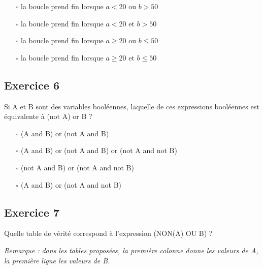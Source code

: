 \documentclass[11pt,a4paper]{article}
\renewcommand{\emph}{\textit}
\providecommand{\tightlist}{\setlength{\itemsep}{0pt}\setlength{\parskip}{0pt}}
\begin{document}
\begin{itemize}
\tightlist
\item[$\square$]
  la boucle prend fin lorsque \(a < 20\) ou \(b > 50\)
\item[$\square$]
  la boucle prend fin lorsque \(a < 20\) et \(b > 50\)
\item[$\square$]
  la boucle prend fin lorsque \(a \geqslant 20\) ou \(b \leqslant 50\)
\item[$\square$]
  la boucle prend fin lorsque \(a \geqslant 20\) et \(b \leqslant 50\)
\end{itemize}

 

\hypertarget{octicons-pencil-16-exercice-6}{%
\subsection*{\faPencil* Exercice
6}\label{octicons-pencil-16-exercice-6}}

Si A et B sont des variables booléennes, laquelle de ces expressions
booléennes est équivalente à (not A) or B ?

\begin{itemize}
\tightlist
\item[$\square$]
  (A and B) or (not A and B)
\item[$\square$]
  (A and B) or (not A and B) or (not A and not B)
\item[$\square$]
  (not A and B) or (not A and not B)
\item[$\square$]
  (A and B) or (not A and not B)
\end{itemize}

 

\hypertarget{octicons-pencil-16-exercice-7}{%
\subsection*{\faPencil* Exercice
7}\label{octicons-pencil-16-exercice-7}}

Quelle table de vérité correspond à l'expression (NON(A) OU B) ?

\emph{Remarque : dans les tables proposées, la première colonne donne
les valeurs de A, la première ligne les valeurs de B.}
\end{document}
